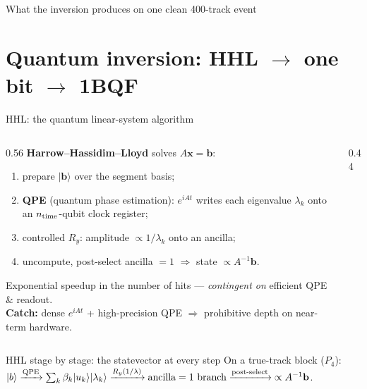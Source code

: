 \begin{frame}{What the inversion produces on one clean 400-track event}
  \centering
\end{frame}

\section{Quantum inversion: HHL $\to$ one bit $\to$ 1BQF}
\begin{frame}{HHL: the quantum linear-system algorithm}
  \begin{columns}[T]
    \begin{column}{0.56\textwidth}
      \textbf{Harrow--Hassidim--Lloyd} solves $A\mathbf{x}=\mathbf{b}$:
      \begin{enumerate}
        \item prepare $|\mathbf{b}\rangle$ over the segment basis;
        \item \textbf{QPE} (quantum phase estimation): $e^{iAt}$ writes each eigenvalue $\lambda_k$ onto an $n_{\rm time}$-qubit clock register;
        \item controlled $R_y$: amplitude $\propto 1/\lambda_k$ onto an ancilla;
        \item uncompute, post-select ancilla $=1$ $\Rightarrow$ state $\propto A^{-1}\mathbf{b}$.
      \end{enumerate}
      \medskip
      Exponential speedup in the number of hits --- \emph{contingent on} efficient QPE \& readout.\\[4pt]
      \textbf{Catch:} dense $e^{iAt}$ + high-precision QPE $\Rightarrow$ prohibitive depth on near-term hardware.
    \end{column}
    \begin{column}{0.44\textwidth}
      \centering{}
    \end{column}
  \end{columns}
\end{frame}

\begin{frame}{HHL stage by stage: the statevector at every step}
  \centering
  \vspace{2pt}
  {\footnotesize On a true-track block ($P_4$): $|b\rangle \xrightarrow{\rm QPE} \sum_k\beta_k|u_k\rangle|\lambda_k\rangle
   \xrightarrow{R_y(1/\lambda)} \text{ancilla}=1 \text{ branch} \xrightarrow{\rm post\text{-}select} \;\propto A^{-1}\mathbf{b}$.}
\end{frame}

